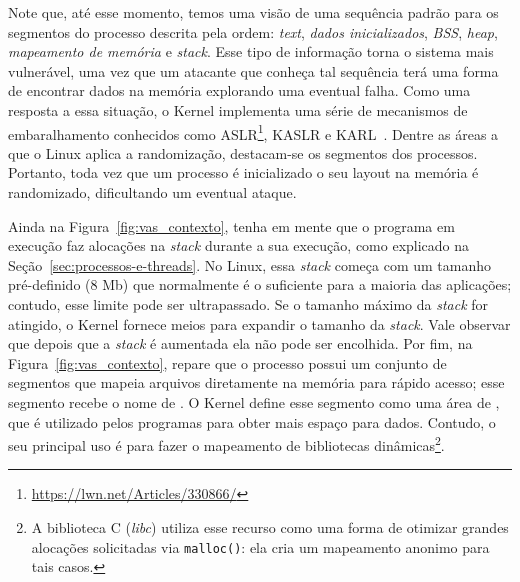 Note que, até esse momento, temos uma visão de uma sequência padrão para os
segmentos do processo descrita pela ordem: \emph{text}, \emph{dados
inicializados}, \emph{BSS}, \emph{heap}, \emph{mapeamento de memória} e
\emph{stack}. Esse tipo de informação torna o sistema mais vulnerável, uma vez
que um atacante que conheça tal sequência terá uma forma de encontrar dados na
memória explorando uma eventual falha. Como uma resposta a essa situação,
o Kernel implementa uma série de mecanismos de embaralhamento
conhecidos como ASLR\footnote{\url{https://lwn.net/Articles/330866/}}, KASLR e
KARL~\citep{kaslr}. Dentre as áreas a que o Linux aplica a randomização,
destacam-se os segmentos dos processos. Portanto, toda vez que um processo é
inicializado o seu layout na memória é randomizado, dificultando um eventual
ataque.

Ainda na Figura~\ref{fig:vas_contexto}, tenha em mente que o programa em
execução faz alocações na \emph{stack} durante a sua execução, como explicado
na Seção~\ref{sec:processos-e-threads}. No Linux, essa \textit{stack} começa
com um tamanho pré-definido (8 Mb) que normalmente é o suficiente para a
maioria das aplicações; contudo, esse limite pode ser ultrapassado. Se o
tamanho máximo da \textit{stack} for atingido, o Kernel fornece meios para
expandir o tamanho da \emph{stack}. Vale observar que depois que a
\textit{stack} é aumentada ela não pode ser encolhida. Por fim, na
Figura~\ref{fig:vas_contexto}, repare que o processo possui um conjunto de
segmentos que mapeia arquivos diretamente na memória para rápido acesso; esse
segmento recebe o nome de . O Kernel
define esse segmento como uma área de , que é
utilizado pelos programas para obter mais espaço para dados. Contudo, o seu
principal uso é para fazer o mapeamento de bibliotecas dinâmicas\footnote{A
biblioteca C (\textit{libc}) utiliza esse recurso como uma forma de otimizar
grandes alocações solicitadas via \texttt{malloc()}: ela cria um mapeamento
anonimo para tais casos.}.


